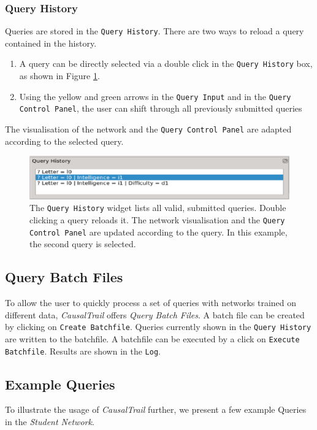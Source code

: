 \subsubsection{Query History}
Queries are stored in the \texttt{Query History}. There are two ways to reload a query contained in the history.
\begin{enumerate}
 \item A query can be directly selected via a double click in the \texttt{Query History} box, as shown in Figure \ref{figure:history}. 
 \item Using the yellow and green arrows in the \texttt{Query Input} and in the \texttt{Query Control Panel}, the user can shift through all previously submitted queries
\end{enumerate}
The visualisation of the network and the \texttt{Query Control Panel} are adapted according to the selected query.
\begin{figure}[H]
 \begin{center}
  \includegraphics[width=\textwidth]{pic/queryHistory.eps}
  \caption{The \texttt{Query History} widget lists all valid, submitted queries. Double clicking a query reloads it. The network visualisation and the \texttt{Query Control Panel} are updated according to the query. In this example, the second query is selected.}
  \label{figure:history}
 \end{center}
\end{figure}

\subsection{Query Batch Files}
To allow the user to quickly process a set of queries with networks trained on different data, \textit{CausalTrail} offers \textit{Query Batch Files}. 
A batch file can be created by clicking on \texttt{Create Batchfile}. Queries currently shown in the \texttt{Query History} are written to the batchfile.
A batchfile can be executed by a click on \texttt{Execute Batchfile}. Results are shown in the \texttt{Log}.

\subsection{Example Queries}
To illustrate the usage of \textit{CausalTrail} further, we present a few example Queries in the \textit{Student Network}.
